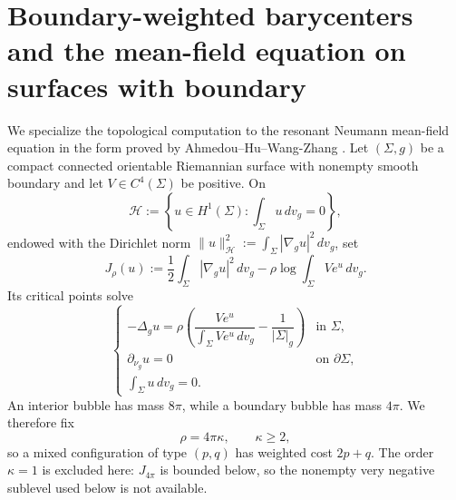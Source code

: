 \documentclass[11pt,a4paper]{article}
\numberwithin{equation}{section}
\theoremstyle{definition}
\theoremstyle{remark}
\newcommand{\Si}{\Sigma}
\newcommand{\pa}{\partial}
\begin{document}


\section{Boundary-weighted barycenters and the mean-field equation on surfaces with boundary}
\label{sec:variational-jump}

We specialize the topological computation to the resonant Neumann mean-field
equation in the form proved by Ahmedou--Hu--Wang-Zhang \cite{AHW2026}. Let
\((\Si,g)\) be a compact connected orientable Riemannian surface with
nonempty smooth boundary and let \(V\in C^4(\Si)\) be positive. On
\[
\mathcal H:=\left\{u\in H^1(\Si):\int_\Si u\,dv_g=0\right\},
\]
endowed with the Dirichlet norm
\(\|u\|_{\mathcal H}^2:=\int_\Si |\nabla_g u|^2\,dv_g\),
set
\begin{equation}\label{eq:Neumann-MF-functional}
J_\rho(u):=\frac12\int_\Si |\nabla_g u|^2\,dv_g
-\rho\log\int_\Si V e^u\,dv_g .
\end{equation}
Its critical points solve
\begin{equation}\label{eq:Neumann-MF-equation}
\begin{cases}
-\Delta_g u=\rho\left(\dfrac{V e^u}{\int_\Si V e^u\,dv_g}
-\dfrac1{|\Si|_g}\right)&\text{in }\Si,\\[1.1em]
\partial_{\nu_g}u=0&\text{on }\pa\Si,\\[0.3em]
\displaystyle\int_\Si u\,dv_g=0.
\end{cases}
\end{equation}
An interior bubble has mass \(8\pi\), while a boundary bubble has mass
\(4\pi\). We therefore fix
\begin{equation}\label{eq:rho-kappa-resonance}
\rho=4\pi\kappa,\qquad \kappa\ge2,
\end{equation}
so a mixed configuration of type \((p,q)\) has weighted cost
$
2p+q.
$
The order \(\kappa=1\) is excluded here: \(J_{4\pi}\) is bounded below, so
the nonempty very negative sublevel used below is not available.
\end{document}
